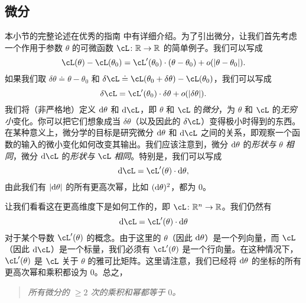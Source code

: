 \documentclass[../../book-main.tex]{subfiles}
\begin{document}
\subsection{微分}

本小节的完整论述在优秀的指南 \cite{bright2025matrix} 中有详细介绍。为了引出微分，让我们首先考虑一个作用于参数 \(\theta\) 的可微函数 \(\cL \colon \R \to \R\) 的简单例子。我们可以写成
\begin{equation}
    \cL(\theta) - \cL(\theta_{0}) = \cL^{\prime}(\theta_{0})\cdot(\theta - \theta_{0}) + o(\abs{\theta - \theta_{0}}).
\end{equation}
如果我们取 \(\delta\theta \doteq \theta - \theta_{0}\) 和 \(\delta\cL \doteq \cL(\theta_{0} + \delta\theta) - \cL(\theta_{0})\)，我们可以写成
\begin{equation}
    \delta\cL = \cL^{\prime}(\theta_{0})\cdot\delta\theta + o(\abs{\delta\theta}).
\end{equation}
我们将（非严格地）定义 \(\mathrm{d}\theta\) 和 \(\odif{\cL}\)，即 \(\theta\) 和 \(\cL\) 的\textit{微分}，为 \(\theta\) 和 \(\cL\) 的\textit{无穷小}变化。你可以把它们想象成当 \(\delta\theta\)（以及因此的 \(\delta \cL\)）变得极小时得到的东西。在某种意义上，微分学的目标是研究微分 \(\mathrm{d}\theta\) 和 \(\odif{\cL}\) 之间的关系，即观察一个函数的输入的微小变化如何改变其输出。我们应该注意到，微分 \(\mathrm{d}\theta\) 的\textit{形状与} \(\theta\) \textit{相同}，微分 \(\odif{\cL}\) 的\textit{形状与} \(\cL\) \textit{相同}。特别是，我们可以写成
\begin{equation}
    \odif{\cL} = \cL^{\prime}(\theta)\cdot\odif{\theta},
\end{equation}
由此我们有 \(\abs{\odif{\theta}}\) 的所有更高次幂，比如 \((\mathrm{d}\theta)^{2}\)，都为 \(0\)。

让我们看看这在更高维度下是如何工作的，即 \(\cL \colon \R^{n} \to \R\)。我们仍然有
\begin{equation}
    \odif{\cL} = \cL^{\prime}(\theta)\cdot\odif{\theta}
\end{equation}
对于某个导数 \(\cL^{\prime}(\theta)\) 的概念。由于这里的 \(\theta\)（因此 \(\mathrm{d}\theta\)）是一个列向量，而 \(\cL\)（因此 \(\odif{\cL}\)）是一个标量，我们必须有 \(\cL^{\prime}(\theta)\) 是一个行向量。在这种情况下，\(\cL^{\prime}(\theta)\) 是 \(\cL\) 关于 \(\theta\) 的雅可比矩阵。这里请注意，我们已经将 \(\mathrm{d}\theta\) 的坐标的所有更高次幂和乘积都设为 \(0\)。总之，
\begin{quote}
    \centering
    \textit{所有微分的 \(\geq 2\) 次的乘积和幂都等于 \(0\)。}
\end{quote}
\end{document}
